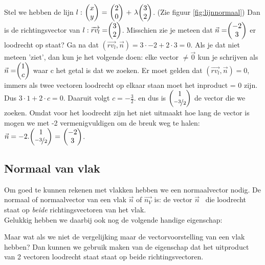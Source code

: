Stel we hebben de lijn $ l: \  \vectwee {x}{y} \ = \ \vectwee {2}{0} \ +\  \lambda  \vectwee {3}{2}  $. (Zie figuur  \ref{fig:lijnnormaal})
Dan is de richtingsvector van $ l:  \overrightarrow{rv_{l}} =  \vectwee {3}{2} $. Misschien zie je meteen dat $ \vec{n} =  \vectwee {-2}{3} $ er loodrecht op staat? Ga na dat  $ (\overrightarrow{rv_{l} }, \vec{n}) = 3\cdot-2 + 2\cdot3  = 0 $. Als je dat niet meteen 'ziet', dan kun je het volgende doen: elke vector  $ \ne \vec{0} $ kun je schrijven als  $ \vec{n} = \vectwee {1}{c} $ waar c het getal is dat we zoeken. Er moet gelden dat  $ (\overrightarrow{rv_{l} }, \vec{n}) = 0 $, immers als twee vectoren loodrecht op elkaar staan moet het inproduct = 0 zijn. Dus $ 3\cdot 1 + 2\cdot c = 0 $. Daaruit volgt $ c =  -\frac{3}{2}. $ en dus is $ \vectwee {1}{\nicefrac{-3}{2}} $ de vector die we zoeken. Omdat voor het loodrecht zijn het niet uitmaakt hoe lang de vector is mogen we met -2 vermenigvuldigen om de breuk weg te halen: $ \vec{n} = -2.\vectwee {1}{\nicefrac{-3}{2}} \ = \  \vectwee {-2}{3} $. 


\subsection{Normaal van vlak}

Om goed te kunnen rekenen met vlakken hebben we een normaalvector nodig.
\label{vlaknormaal}
{De normaal of normaalvector van een vlak $\vec{n}$ of  $\overrightarrow{n_{V}}$ is:
	de vector $ \vec{n} $  \ die loodrecht staat op \textit{beide} richtingsvectoren van het vlak. \\ 
	Gelukkig hebben we daarbij ook nog de volgende handige eigenschap:}


Maar wat als we niet de vergelijking maar de vectorvoorstelling van een vlak hebben? Dan kunnen we gebruik maken van de eigenschap dat  het uitproduct van 2 vectoren loodrecht staat staat op beide richtingsvectoren. 

